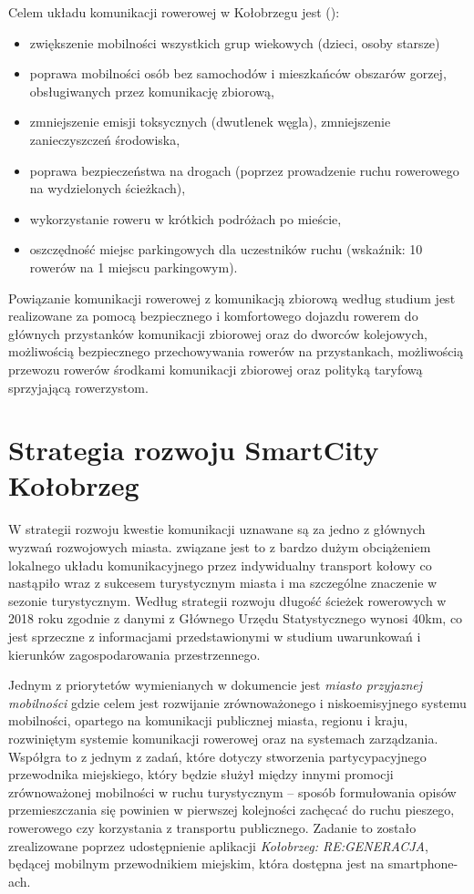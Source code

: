 \documentclass{amuthesis}
\begin{document}
Celem układu komunikacji rowerowej w Kołobrzegu jest (\textcite{studium_uwarunkowan}):

\begin{itemize}
\item
  zwiększenie mobilności wszystkich grup wiekowych (dzieci, osoby starsze)
\item
  poprawa mobilności osób bez samochodów i mieszkańców obszarów gorzej, obsługiwanych
  przez komunikację zbiorową,
\item
  zmniejszenie emisji toksycznych (dwutlenek węgla), zmniejszenie zanieczyszczeń środowiska,
\item
  poprawa bezpieczeństwa na drogach (poprzez prowadzenie ruchu rowerowego na wydzielonych
  ścieżkach),
\item
  wykorzystanie roweru w krótkich podróżach po mieście,
\item
  oszczędność miejsc parkingowych dla uczestników ruchu (wskaźnik: 10 rowerów na 1 miejscu
  parkingowym).
\end{itemize}

Powiązanie komunikacji rowerowej z komunikacją zbiorową według studium jest realizowane za pomocą bezpiecznego i komfortowego dojazdu rowerem do głównych przystanków komunikacji zbiorowej oraz do dworców kolejowych, możliwością bezpiecznego przechowywania rowerów na przystankach, możliwością przewozu rowerów środkami komunikacji zbiorowej oraz polityką taryfową sprzyjającą rowerzystom.

\hypertarget{strategia_roz}{%
\section{Strategia rozwoju SmartCity Kołobrzeg}\label{strategia_roz}}

W strategii rozwoju kwestie komunikacji uznawane są za jedno z głównych wyzwań rozwojowych miasta.
związane jest to z bardzo dużym obciążeniem lokalnego układu komunikacyjnego przez indywidualny transport kołowy co nastąpiło wraz z sukcesem turystycznym miasta i ma szczególne znaczenie w sezonie turystycznym.
Według strategii rozwoju długość ścieżek rowerowych w 2018 roku zgodnie z danymi z Głównego Urzędu Statystycznego wynosi 40km, co jest sprzeczne z informacjami przedstawionymi w studium uwarunkowań i kierunków zagospodarowania przestrzennego.

Jednym z priorytetów wymienianych w dokumencie jest \emph{miasto przyjaznej mobilności} gdzie celem jest rozwijanie zrównoważonego i niskoemisyjnego systemu mobilności, opartego na komunikacji publicznej miasta, regionu i kraju, rozwiniętym systemie komunikacji rowerowej oraz na systemach zarządzania. Współgra to z jednym z zadań, które dotyczy stworzenia partycypacyjnego przewodnika miejskiego, który będzie służył między innymi promocji zrównoważonej mobilności w ruchu turystycznym -- sposób formułowania opisów
przemieszczania się powinien w pierwszej kolejności zachęcać do ruchu pieszego, rowerowego
czy korzystania z transportu publicznego.
Zadanie to zostało zrealizowane poprzez udostępnienie aplikacji \emph{Kołobrzeg: RE:GENERACJA}, będącej mobilnym przewodnikiem miejskim, która dostępna jest na smartphone-ach.
\end{document}
